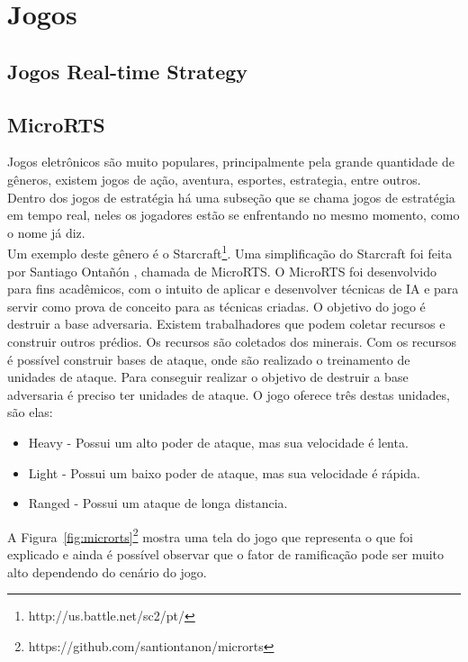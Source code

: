 \chapter{\label{chap:games}Jogos}
 
 \section{Jogos Real-time Strategy} 
 \section{MicroRTS}
 
 Jogos eletrônicos são muito populares, principalmente pela grande quantidade de gêneros, existem jogos de ação, aventura, esportes, estrategia, entre outros. Dentro dos jogos de estratégia há uma subseção que se chama jogos de estratégia em tempo real, neles os jogadores estão se enfrentando no mesmo momento, como o nome já diz. \\
 
 Um exemplo deste gênero é o Starcraft\footnote{http://us.battle.net/sc2/pt/}.  Uma simplificação do Starcraft foi feita por Santiago Ontañón \cite{ontanon2013combinatorial}, chamada de MicroRTS. O MicroRTS foi desenvolvido para fins acadêmicos, com o intuito de aplicar e desenvolver técnicas de IA e para servir como prova de conceito para as técnicas criadas.  O objetivo do jogo é destruir a base adversaria. Existem trabalhadores que podem coletar recursos e construir outros prédios. Os recursos são coletados dos minerais. Com os recursos é possível construir bases de ataque, onde são realizado o treinamento de unidades de ataque. Para conseguir realizar o objetivo de destruir a base adversaria é preciso ter unidades de ataque. O jogo oferece três destas unidades, são elas:
 
 \begin{itemize}
 	\item Heavy - Possui um alto poder de ataque, mas sua velocidade é lenta.
 	\item Light - Possui um baixo poder de ataque, mas sua velocidade é rápida.
 	\item Ranged - Possui um ataque de longa distancia. 
 \end{itemize} 
 
 A Figura~\ref{fig:microrts}\footnote{https://github.com/santiontanon/microrts} mostra uma tela do jogo que representa o que foi explicado e ainda é possível observar que o fator de ramificação pode ser muito alto dependendo do cenário do jogo. %
 
